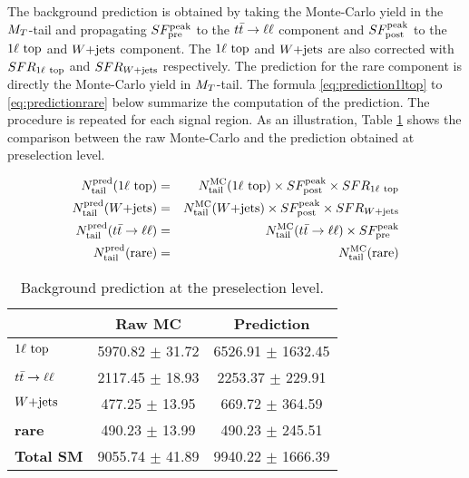         The background prediction is obtained by taking the Monte-Carlo yield in the 
        $M_T$-tail and propagating $SF_{\text{pre}}^{\text{peak}}$ to the $t\bar{t} \rightarrow \ell \ell$ component and $SF_{\text{post}}^{\text{peak}}$ 
        to the $1\ell~\text{top}$ and $\text{$W$+jets}$ component. The $1\ell~\text{top}$ and $\text{$W$+jets}$ 
        are also corrected with $SFR_{1\ell~\text{top}}$ and $SFR_{\text{$W$+jets}}$ respectively. The 
        prediction for the rare component is directly the Monte-Carlo yield in $M_T$-tail. 
        The formula \ref{eq:prediction1ltop} to \ref{eq:predictionrare} below summarize 
        the computation of the prediction. The procedure is repeated for each signal 
        region. As an illustration, Table \ref{tab:predictionPreselection} shows the 
        comparison between the raw Monte-Carlo and the prediction obtained at preselection 
        level.

        \begin{eqnarray}
            N^\text{pred}_\text{tail}(1\ell~\text{top}) & = & N^\text{MC}_\text{tail}(1\ell~\text{top})  \times SF_{\text{post}}^{\text{peak}} \times SFR_{1\ell~\text{top}} \label{eq:prediction1ltop}  \\
            N^\text{pred}_\text{tail}(\text{$W$+jets})        & = & N^\text{MC}_\text{tail}(\text{$W$+jets})         \times SF_{\text{post}}^{\text{peak}}  \times SFR_{\text{$W$+jets}}                             \\
            N^\text{pred}_\text{tail}(t\bar{t} \rightarrow \ell \ell)  & = & N^\text{MC}_\text{tail}(t\bar{t} \rightarrow \ell \ell)   \times SF_{\text{pre}}^{\text{peak}}                                                \\
            N^\text{pred}_\text{tail}(\text{rare})   & = & N^\text{MC}_\text{tail}(\text{rare})                                           \label{eq:predictionrare} 
        \end{eqnarray}

        \begin{table}[!h]
            \begin{center}
                \begin{tabular}{|l|c|c|}
                    \hline
                                             &  \textbf{Raw MC}          & \textbf{Prediction}       \\
                    \hline
                    \textbf{$1\ell~\text{top}$} &  5970.82 $\pm$ 31.72      & 6526.91 $\pm$ 1632.45     \\
                    \textbf{$t\bar{t} \rightarrow \ell \ell$}  &  2117.45 $\pm$ 18.93      & 2253.37 $\pm$ 229.91      \\
                    \textbf{$\text{$W$+jets}$}        &  477.25  $\pm$ 13.95       & 669.72 $\pm$ 364.59       \\
                    \textbf{rare}            &  490.23  $\pm$ 13.99       & 490.23 $\pm$ 245.51       \\
                    \hline
                    \textbf{Total SM}        &  9055.74 $\pm$ 41.89      & 9940.22 $\pm$ 1666.39     \\
                    \hline
                \end{tabular}
                \caption{ Background prediction at the preselection level.}
                \label{tab:predictionPreselection}
            \end{center}
        \end{table}

